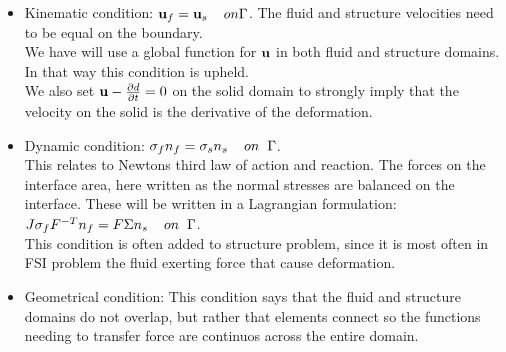\begin{itemize}
\item Kinematic condition: $\bold{u}_f = \bold{u}_s  \hspace{4mm} on \Gamma$. The fluid and structure velocities need to be equal on the boundary. \\
We have will use a global function for $\bold{u}$ in both fluid and structure domains. In that way this condition is upheld.\\
We also set  $\bold{u} - \frac{\partial d}{\partial t}  = 0  $ on the solid domain to strongly imply that the velocity on the solid is the derivative of the deformation.  

\item Dynamic condition: $  \sigma_f n_f = \sigma_s n_s \hspace{4mm} on  \hspace{2mm}\Gamma   $. \\
	This relates to Newtons third law of action and reaction. The forces on the interface area, here written as the normal stresses are balanced on the interface. These will be written in a Lagrangian formulation: \\
	$J\sigma_f F^{-T} n_f = F\Sigma n_s \hspace{4mm} on  \hspace{2mm}\Gamma $. \\
	This condition is often added to structure problem, since it is most often in FSI problem the fluid exerting force that cause deformation.
\item Geometrical condition: This condition says that the fluid and structure domains do not overlap, but rather that elements connect so the functions needing to transfer force are continuos across the entire domain.
\end{itemize}

